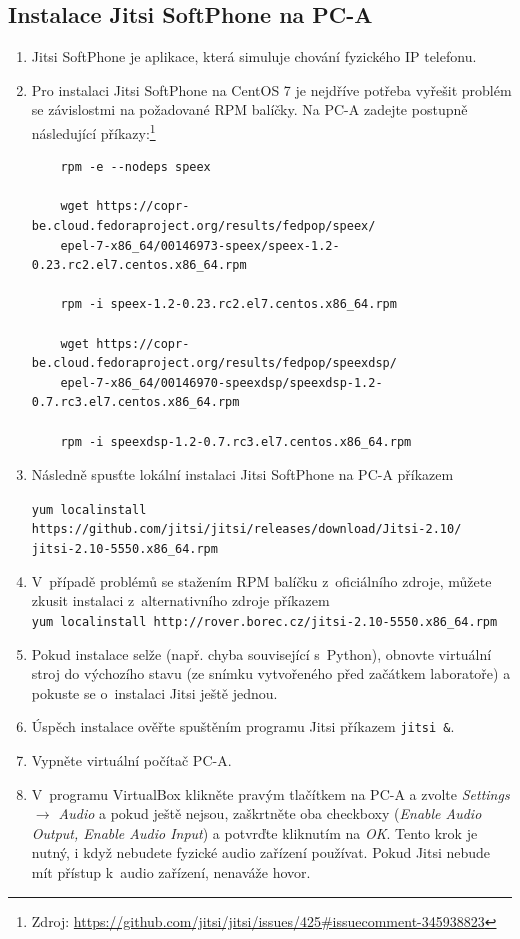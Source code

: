 \subsection{Instalace Jitsi SoftPhone na PC-A}
\begin{enumerate}
  \item Jitsi SoftPhone je aplikace, která simuluje chování fyzického IP telefonu.
  
  \item Pro instalaci Jitsi SoftPhone na CentOS 7 je nejdříve potřeba vyřešit problém se závislostmi na požadované RPM balíčky. Na PC-A zadejte postupně následující příkazy:\footnote{Zdroj: \url{https://github.com/jitsi/jitsi/issues/425#issuecomment-345938823}}
      
	\begin{verbatim}
	rpm -e --nodeps speex
	
	wget https://copr-be.cloud.fedoraproject.org/results/fedpop/speex/
	epel-7-x86_64/00146973-speex/speex-1.2-0.23.rc2.el7.centos.x86_64.rpm
	
	rpm -i speex-1.2-0.23.rc2.el7.centos.x86_64.rpm
	
	wget https://copr-be.cloud.fedoraproject.org/results/fedpop/speexdsp/
	epel-7-x86_64/00146970-speexdsp/speexdsp-1.2-0.7.rc3.el7.centos.x86_64.rpm
	
	rpm -i speexdsp-1.2-0.7.rc3.el7.centos.x86_64.rpm
	\end{verbatim}
	
  \item Následně spusťte lokální instalaci Jitsi SoftPhone na PC-A příkazem
  
  \verb{yum localinstall https://github.com/jitsi/jitsi/releases/download/Jitsi-2.10/{\\
  \verb{jitsi-2.10-5550.x86_64.rpm{
  
  \item V~případě problémů se stažením RPM balíčku z~oficiálního zdroje, můžete zkusit instalaci z~alternativního zdroje příkazem\\
  \verb{yum localinstall http://rover.borec.cz/jitsi-2.10-5550.x86_64.rpm{
  
  \item Pokud instalace selže (např. chyba související s~Python), obnovte virtuální stroj do výchozího stavu (ze snímku vytvořeného před začátkem laboratoře) a pokuste se o~instalaci Jitsi ještě jednou.
  
  \item Úspěch instalace ověřte spuštěním programu Jitsi příkazem \texttt{jitsi \&}.
  
  \item Vypněte virtuální počítač PC-A.
  
  \item V~programu VirtualBox klikněte pravým tlačítkem na PC-A a zvolte \emph{Settings $\rightarrow$ Audio} a pokud ještě nejsou, zaškrtněte oba checkboxy (\emph{Enable Audio Output, Enable Audio Input}) a potvrďte kliknutím na \emph{OK}. Tento krok je nutný, i když nebudete fyzické audio zařízení používat. Pokud Jitsi nebude mít přístup k~audio zařízení, nenaváže hovor.
\end{enumerate}
  

